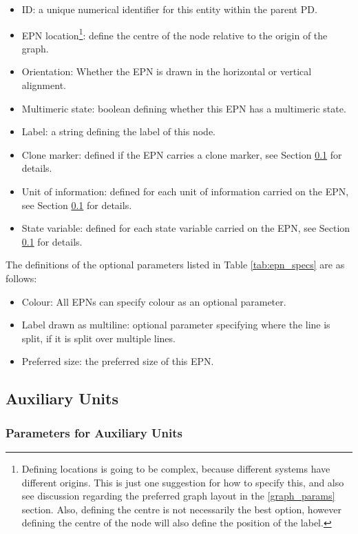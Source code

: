 \documentclass[11pt]{article}
\begin{document}
\begin{itemize}
\item ID: a unique numerical identifier for this entity within the parent PD.
\item EPN location\footnote{Defining locations is going to be complex, because different systems have different origins.  This is just one suggestion for how to specify this, and also see discussion regarding the preferred graph layout in the \ref{graph_params} section.  Also, defining the centre is not necessarily the best option, however defining the centre of the node will also define the position of the label.}: define the centre of the node relative to the origin of the graph.
\item Orientation: Whether the EPN is drawn in the horizontal or vertical alignment.
\item Multimeric state: boolean defining whether this EPN has a multimeric state.
\item Label: a string defining the label of this node.
\item Clone marker: defined if the EPN carries a clone marker, see Section \ref{aux_params} for details.
\item Unit of information: defined for each unit of information carried on the EPN, see Section \ref{aux_params} for details.
\item State variable: defined for each state variable carried on the EPN, see Section \ref{aux_params} for details.
\end{itemize}

The definitions of the optional parameters listed in Table \ref{tab:epn_specs} are as follows:

\begin{itemize}
\item Colour: All EPNs can specify colour as an optional parameter.
\item Label drawn as multiline: optional parameter specifying where the line is split, if it is split over multiple lines.
\item Preferred size: the preferred size of this EPN.
\end{itemize}

\subsection{Auxiliary Units}
\label{aux_params}

\subsubsection{Parameters for Auxiliary Units}
\end{document}
